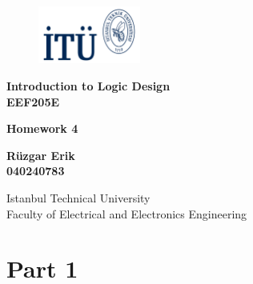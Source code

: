 \documentclass[table ]{article}
\def\mytitle{Homework 4}
\begin{document}
\begin{titlepage}
    \begin{figure}[h] %
        \begin{flushright}
        \includegraphics[width=0.3\textwidth]{logo_laci.png} %
            
        \end{flushright}
        \hfill
    \end{figure}

    \centering
    \vspace*{1in}
    
    \Huge
    \textbf{Introduction to Logic Design} \\
    \textbf{EEF205E} \\

    \vspace{0.5in}

    \Large
    \textbf{\mytitle} \\
    
    \vspace{0.5in}

    \large
    \textbf{Rüzgar Erik} \\
    \textbf{040240783} \\

    \vspace{0.5in}
    
    \Large
    Istanbul Technical University \\
    Faculty of Electrical and Electronics Engineering \\
    
    \vfill


\end{titlepage}



\section*{Part 1}
\end{document}
